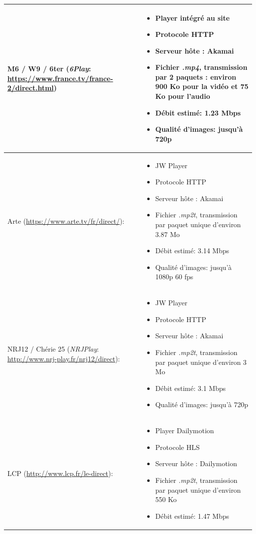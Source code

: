 \documentclass{polytech/polytech}
\begin{document}
\begin{longtabu}{|X|X[1.15]|}
\hline
M6 / W9 / 6ter (\textit{6Play}: \url{https://www.france.tv/france-2/direct.html})
& \begin{itemize}
	\item Player intégré au site
	\item Protocole HTTP
	\item Serveur hôte : Akamai
	\item Fichier \textit{.mp4}, transmission par 2 paquets : environ 900 Ko pour la vidéo et 75 Ko pour l'audio
	\item Débit estimé: 1.23 Mbps
	\item Qualité d'images: jusqu'à 720p
\end{itemize} \\
\hline
Arte (\url{https://www.arte.tv/fr/direct/}):
& \begin{itemize}
	\item JW Player
	\item Protocole HTTP
	\item Serveur hôte : Akamai
	\item Fichier \textit{.mp2t}, transmission par paquet unique d'environ 3.87 Mo
	\item Débit estimé: 3.14 Mbps
	\item Qualité d'images: jusqu'à 1080p 60 fps
\end{itemize} \\
\hline
NRJ12 / Chérie 25 (\textit{NRJPlay}: \url{http://www.nrj-play.fr/nrj12/direct}):
& \begin{itemize}
	\item JW Player
	\item Protocole HTTP
	\item Serveur hôte : Akamai
	\item Fichier \textit{.mp2t}, transmission par paquet unique d'environ 3 Mo
	\item Débit estimé: 3.1 Mbps
	\item Qualité d'images: jusqu'à 720p
\end{itemize} \\
\hline
LCP (\url{http://www.lcp.fr/le-direct}):
& \begin{itemize}
	\item Player Dailymotion
	\item Protocole HLS
	\item Serveur hôte : Dailymotion
	\item Fichier \textit{.mp2t}, transmission par paquet unique d'environ 550 Ko
	\item Débit estimé: 1.47 Mbps

\end{itemize}
\end{longtabu}
\end{document}
